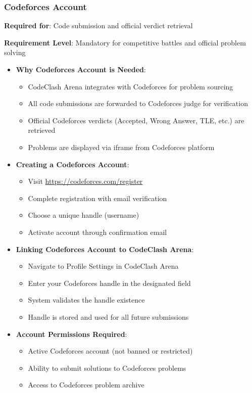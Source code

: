 \documentclass[12pt]{article}
\begin{document}
\subsubsection{Codeforces Account}

\textbf{Required for}: Code submission and official verdict retrieval

\textbf{Requirement Level}: Mandatory for competitive battles and official problem solving

\begin{itemize}
\item \textbf{Why Codeforces Account is Needed}:
  \begin{itemize}
    \item CodeClash Arena integrates with Codeforces for problem sourcing
    \item All code submissions are forwarded to Codeforces judge for verification
    \item Official Codeforces verdicts (Accepted, Wrong Answer, TLE, etc.) are retrieved
    \item Problems are displayed via iframe from Codeforces platform
  \end{itemize}
\item \textbf{Creating a Codeforces Account}:
  \begin{itemize}
    \item Visit \url{https://codeforces.com/register}
    \item Complete registration with email verification
    \item Choose a unique handle (username)
    \item Activate account through confirmation email
  \end{itemize}
\item \textbf{Linking Codeforces Account to CodeClash Arena}:
  \begin{itemize}
    \item Navigate to Profile Settings in CodeClash Arena
    \item Enter your Codeforces handle in the designated field
    \item System validates the handle existence
    \item Handle is stored and used for all future submissions
  \end{itemize}
\item \textbf{Account Permissions Required}:
  \begin{itemize}
    \item Active Codeforces account (not banned or restricted)
    \item Ability to submit solutions to Codeforces problems
    \item Access to Codeforces problem archive
  \end{itemize}
\end{itemize}
\end{document}
